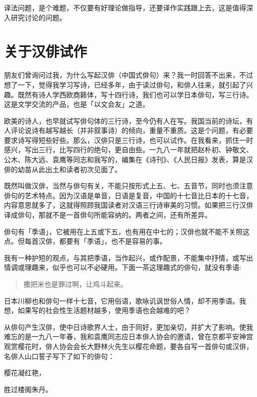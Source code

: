 {    译法问题，是个难题，不仅要有好理论做指导，还要译作实践跟上去，这是值得深入研究讨论的问题。

    \section*{\FS 关于汉俳试作}

    朋友们曾询问过我，为什么写起汉俳（中国式俳句）来？我一时回答不出来，不过想了一下，觉得我学习写诗，已经多年，由于读过俳句，和俳人往来，就引起了兴趣。既然有诗人学西欧商籁体，写十四行诗，我们也可以学日本俳句，写三行诗。这是文学交流的产品，也是「以文会友」之道。

    欧美的诗人，也早就试写俳句体的三行诗，至今仍有人在写。我国当前的诗坛，有人评论说诗有越写越长（并非叙事诗）的倾向，重量不重质。这是个问题，有必要要求诗写得短些好些。那么，汉俳只是三行诗，也可以试作。在我看来，抓住一时感兴，写出三行，比写四行的绝句，更自由些。一九八一年就把赵朴初、钟敬文、公木、陈大远、袁鹰等同志和我写的，编集在《诗刊》、《人民日报》发表，算是汉俳的幼苗从此出土和读者初次见面了。

    既然叫做汉俳，当然与俳句有关，不能只按形式上五、七、五音节，同时也须注意俳句的艺术特点。因为汉语是单音，日语是复音，中国的十七音比日本的十七音，内容意思就多了，这就得照顾我国读者对汉语三行诗审美的习惯。如果把三行汉俳译成俳句，那就不是一首俳句所能容纳的。两者之间，还有所差异。

    俳句有「季语」，它被用在上五或下五，也有用在中七的；汉俳也就不能不关照这点。但每首汉俳，都要有「季语」，也不是容易的事。

    我有一种护短的观点，与其把季语，当作起兴，或作配景，不能集中抒情，或写出情调或理趣来，似乎也可以不必硬用。下面一茶这理趣式的俳句，就没有季语:

    \begin{quote}
        撒把米也是罪过啊，让鸡斗起来。
    \end{quote}

    日本川柳也和俳句一样十七音，它用俗语，歌咏讥讽世俗人情，却不用季语。我想，如果写的社会性生活题材越多，使用季语也会越难的吧？

    从俳句产生汉俳，使中日诗歌界人士，由于同好，更加亲切，并扩大了影响。使我难忘的是一九八一年春，我和袁鹰同志应日本俳人协会的邀请，曾在京都平安神宫观赏樱花时，俳人协会会长大野林火先生以樱花命题，要各自写一首俳句或汉俳，名俳人山口誓子写下了如下的俳句：

    \begin{center}
        樱花凝红艳，

        胜过楼阁朱丹。
    \end{center}

}
